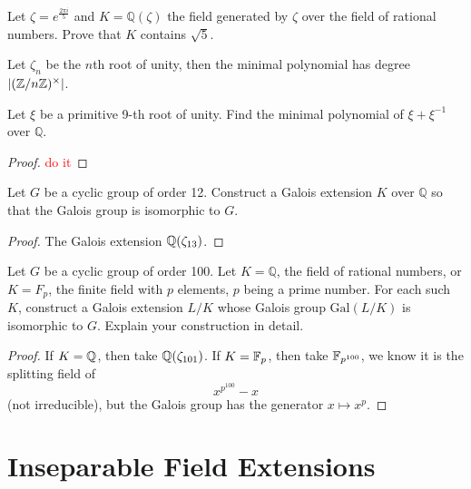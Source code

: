 \begin{prob}[S2002-Q5]
    Let \(\zeta = e^{\frac{2\pi i}{5}}\) and \(K = \mathbb{Q}(\zeta)\) the field generated by \(\zeta\) over the field of rational numbers. Prove that \(K\) contains \(\sqrt{5}\).
\end{prob}

\begin{prop}
    Let $\zeta_n$ be the $n$th root of unity, then the minimal polynomial has degree $|(\mathbb{Z}/n\mathbb{Z})^\times|$. 
\end{prop}

\begin{prob}[S2008-Q2]
    Let \(\xi\) be a primitive 9-th root of unity. Find the minimal polynomial of \(\xi + \xi^{-1}\) over \(\mathbb{Q}\).
\end{prob}
\begin{proof}
    \textcolor{red}{do it}
\end{proof}

\begin{prob}[F2007-Q1]
    Let \(G\) be a cyclic group of order 12. Construct a Galois extension \(K\) over \(\mathbb{Q}\) so that the Galois group is isomorphic to \(G\).
\end{prob}
\begin{proof}
    The Galois extension $\mathbb{Q}(\zeta_{13})$.
\end{proof}


\begin{prob}[F2011-Q3]
    Let \(G\) be a cyclic group of order 100. Let \(K=\mathbb{Q}\), the field of rational numbers, or \(K=F_p\), the finite field with \(p\) elements, \(p\) being a prime number. For each such \(K\), construct a Galois extension \(L/K\) whose Galois group \(\text{Gal}(L/K)\) is isomorphic to \(G\). Explain your construction in detail.
\end{prob}
\begin{proof}
    If $K=\mathbb{Q}$, then take $\mathbb{Q}(\zeta_{101})$. If $K=\mathbb{F}_p$, then take $\mathbb{F}_{p^{100}}$, we know it is the splitting field of 
    \begin{equation*}
        x^{p^{100}}-x
    \end{equation*}
    (not irreducible), but the Galois group has the generator $x\mapsto x^{p}$.
\end{proof}




\section{Inseparable Field Extensions}

